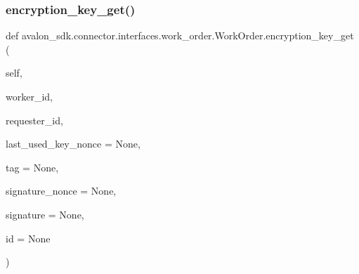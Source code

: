 \subsubsection{\texorpdfstring{encryption\+\_\+key\+\_\+get()}{encryption\_key\_get()}}
{\footnotesize\ttfamily def avalon\+\_\+sdk.\+connector.\+interfaces.\+work\+\_\+order.\+Work\+Order.\+encryption\+\_\+key\+\_\+get (\begin{DoxyParamCaption}\item[{}]{self,  }\item[{}]{worker\+\_\+id,  }\item[{}]{requester\+\_\+id,  }\item[{}]{last\+\_\+used\+\_\+key\+\_\+nonce = {\ttfamily None},  }\item[{}]{tag = {\ttfamily None},  }\item[{}]{signature\+\_\+nonce = {\ttfamily None},  }\item[{}]{signature = {\ttfamily None},  }\item[{}]{id = {\ttfamily None} }\end{DoxyParamCaption})}

